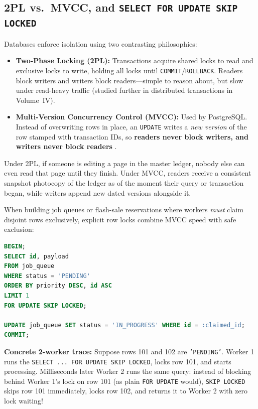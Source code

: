 \subsection{2PL vs.\ MVCC, and \texttt{SELECT FOR UPDATE SKIP LOCKED}}

Databases enforce isolation using two contrasting philosophies:
\begin{itemize}[leftmargin=15pt]
  \item \textbf{Two-Phase Locking (2PL):} Transactions acquire shared locks to read and exclusive locks to write, holding all locks until \texttt{COMMIT}/\texttt{ROLLBACK}. Readers block writers and writers block readers---simple to reason about, but slow under read-heavy traffic (studied further in distributed transactions in Volume~IV).
  \item \textbf{Multi-Version Concurrency Control (MVCC):} Used by PostgreSQL. Instead of overwriting rows in place, an \texttt{UPDATE} writes a \emph{new version} of the row stamped with transaction IDs, so \textbf{readers never block writers, and writers never block readers} \cite{kleppmann2017designing}.
\end{itemize}

\begin{intuitionbox}
Under 2PL, if someone is editing a page in the master ledger, nobody else can even read that page until they finish. Under MVCC, readers receive a consistent snapshot photocopy of the ledger as of the moment their query or transaction began, while writers append new dated versions alongside it.
\end{intuitionbox}

When building job queues or flash-sale reservations where workers \emph{must} claim disjoint rows exclusively, explicit row locks combine MVCC speed with safe exclusion:

\begin{lstlisting}[language=SQL,caption={Lock-Contention-Free Queue Worker Pattern with \texttt{SKIP LOCKED}}]
BEGIN;
SELECT id, payload
FROM job_queue
WHERE status = 'PENDING'
ORDER BY priority DESC, id ASC
LIMIT 1
FOR UPDATE SKIP LOCKED;

UPDATE job_queue SET status = 'IN_PROGRESS' WHERE id = :claimed_id;
COMMIT;
\end{lstlisting}

\textbf{Concrete 2-worker trace:} Suppose rows 101 and 102 are \texttt{'PENDING'}. Worker 1 runs the \texttt{SELECT ... FOR UPDATE SKIP LOCKED}, locks row 101, and starts processing. Milliseconds later Worker 2 runs the same query: instead of blocking behind Worker 1's lock on row 101 (as plain \texttt{FOR UPDATE} would), \texttt{SKIP LOCKED} skips row 101 immediately, locks row 102, and returns it to Worker 2 with zero lock waiting!

